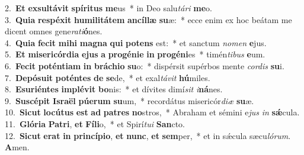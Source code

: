 {2.~}\textbf{Et} \textbf{ex}\textbf{sul}\textbf{tá}\textbf{vit} \textbf{spí}\textbf{ri}\textbf{tus} \textbf{me}us~* in Deo salu\textit{tá}\textit{ri} \textbf{me}o.\\
{3.~}\textbf{Qui}\textbf{a} \textbf{re}\textbf{spé}\textbf{xit} \textbf{hu}\textbf{mi}\textbf{li}\textbf{tá}\textbf{tem} \textbf{an}\textbf{cíl}\textbf{læ} \textbf{su}æ:~* ecce enim ex hoc beátam me dicent omnes gene\textit{ra}\textit{ti}\textbf{ó}nes.\\
{4.~}\textbf{Qui}\textbf{a} \textbf{fe}\textbf{cit} \textbf{mi}\textbf{hi} \textbf{ma}\textbf{gna} \textbf{qui} \textbf{po}\textbf{tens} est:~* et sanctum \textit{no}\textit{men} \textbf{e}jus.\\
{5.~}\textbf{Et} \textbf{mi}\textbf{se}\textbf{ri}\textbf{cór}\textbf{di}\textbf{a} \textbf{e}\textbf{jus} \textbf{a} \textbf{pro}\textbf{gé}\textbf{ni}\textbf{e} \textbf{in} \textbf{pro}\textbf{gé}\textbf{ni}es~* timén\textit{ti}\textit{bus} \textbf{e}um.\\
{6.~}\textbf{Fe}\textbf{cit} \textbf{po}\textbf{tén}\textbf{ti}\textbf{am} \textbf{in} \textbf{brá}\textbf{chi}\textbf{o} \textbf{su}o:~* dispérsit supérbos mente \textit{cor}\textit{dis} \textbf{su}i.\\
{7.~}\textbf{De}\textbf{pó}\textbf{su}\textbf{it} \textbf{po}\textbf{tén}\textbf{tes} \textbf{de} \textbf{se}de,~* et exal\textit{tá}\textit{vit} \textbf{hú}miles.\\
{8.~}\textbf{E}\textbf{su}\textbf{ri}\textbf{én}\textbf{tes} \textbf{im}\textbf{plé}\textbf{vit} \textbf{bo}nis:~* et dívites dimí\textit{sit} \textit{i}\textbf{ná}nes.\\
{9.~}\textbf{Su}\textbf{scé}\textbf{pit} \textbf{Is}\textbf{ra}\textbf{ël} \textbf{pú}\textbf{e}\textbf{rum} \textbf{su}um,~* recordátus misericór\textit{di}\textit{æ} \textbf{su}æ.\\
{10.~}\textbf{Si}\textbf{cut} \textbf{lo}\textbf{cú}\textbf{tus} \textbf{est} \textbf{ad} \textbf{pa}\textbf{tres} \textbf{no}stros,~* Abraham et sémini e\textit{jus} \textit{in} \textbf{sǽ}cula.\\
{11.~}\textbf{Gló}\textbf{ri}\textbf{a} \textbf{Pa}\textbf{tri}, \textbf{et} \textbf{Fí}\textbf{li}o,~* et Spirí\textit{tu}\textit{i} \textbf{San}cto.\\
{12.~}\textbf{Si}\textbf{cut} \textbf{e}\textbf{rat} \textbf{in} \textbf{prin}\textbf{cí}\textbf{pi}\textbf{o}, \textbf{et} \textbf{nunc}, \textbf{et} \textbf{sem}per,~* et in sǽcula sæcu\textit{ló}\textit{rum}. \textbf{A}men.\\
